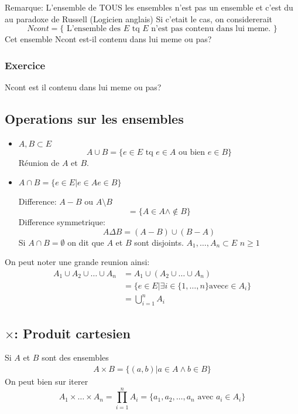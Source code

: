 \documentclass[../main.tex]{subfiles}
\begin{document}
Remarque: L'ensemble de TOUS les ensembles n'est pas un ensemble et c'est du au paradoxe de Russell (Logicien anglais)
Si c'etait le cas, on considererait
\[ 
	Ncont = \{ \text{ L'ensemble des $E$ tq $E$ n'est pas contenu dans lui meme. } \}
\]
Cet ensemble Ncont est-il contenu dans lui meme ou pas?\\
\subsubsection{ Exercice }
Ncont est il contenu dans lui meme ou pas? \contra

\subsection{Operations sur les ensembles}
\begin{itemize}
	\item $A,B \subset E$
\[ 
A \cup B = \{ e \in E \text{ tq } e \in A \text{ ou bien } e \in B \}
\]
Réunion de $A$ et $B$.
\item $A \cap B = \{ e \in E \vert e \in A  e \in B \}$

Difference: $A-B$ ou $A\setminus B$
 \[ 
	 = \{A \in A \land \not\in B \}
\]
Difference symmetrique:
\[ 
	A \Delta B = ( A -B) \cup ( B-A)
\]
Si $A \cap B = \emptyset$  on dit que $A$ et  $B$ sont disjoints.
$ A_1, \ldots, A_{n} \subset E $ $n \geq 1$ \\
\end{itemize}

On peut noter une grande reunion ainsi:
\begin{align*}
	A_1 \cup A_2 \cup \ldots \cup A_{n} &= A_1 \cup ( A_2 \cup \ldots \cup A_{n} )\\
					    &= \{ e \in E \vert \exists i \in \{1,\ldots,n\} \text{avec} e \in A_{i} \}\\
					    &= \bigcup_{i=1}^{n} A_{i} 
\end{align*}



\subsection{$\times$: Produit cartesien}

Si $A$ et $B$ sont des ensembles
\begin{align*}
A\times B = \{ (a,b) \vert a \in A \land b \in B\}
\end{align*}
On peut bien sur iterer
\[ 
	A_1 \times \ldots \times A_{n}  = \prod_{i=1}^{n} A_{i}  =  \{a_1,a_2,\ldots,a_{n} \text{ avec } a_i \in A_{i}\}
\]
\end{document}
